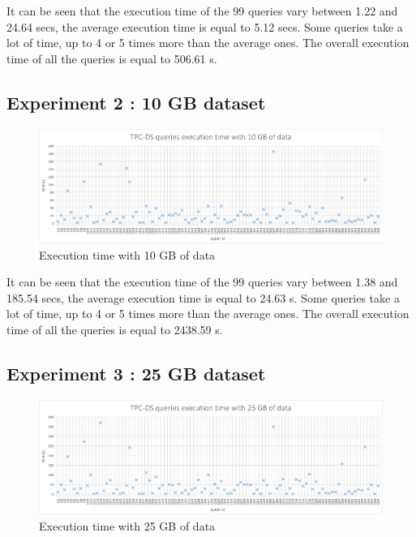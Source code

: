 \documentclass{article}
\begin{document}
It can be seen that the execution time of the 99 queries vary between 1.22 and 24.64 secs, the average execution time is equal to 5.12 secs. Some queries take a lot of time, up to 4 or 5 times more than the average ones. The overall execution time of all the queries is equal to 506.61 s.



\subsection{Experiment 2 : 10 GB dataset}

\begin{figure}[H]
\begin{adjustwidth}{-2cm}{-2cm}
\begin{center}
\includegraphics[width=20cm]{images/ExecutionTime10GB.png}
\end{center}
\end{adjustwidth}
\caption{Execution time with 10 GB of data}
\label{ExecutionTime10GB}
\end{figure}

It can be seen that the execution time of the 99 queries vary between 1.38 and 185.54 secs, the average execution time is equal to 24.63 s. Some queries take a lot of time, up to 4 or 5 times more than the average ones. The overall execution time of all the queries is equal to 2438.59 s.


\subsection{Experiment 3 : 25 GB dataset}

\begin{figure}[H] 
\begin{adjustwidth}{-2cm}{-2cm}
\begin{center}
\includegraphics[width=20cm]{images/ExecutionTime25GB.png}
\end{center}
\end{adjustwidth}
\caption{Execution time with 25 GB of data}
\label{ExecutionTime25GB}
\end{figure}
\end{document}
